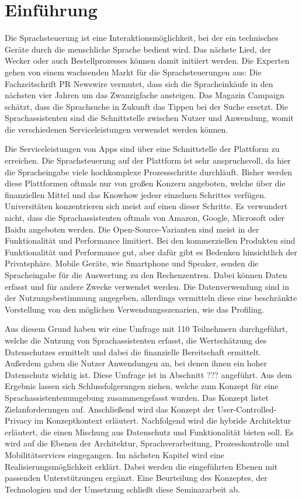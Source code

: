 \section{Einführung}

Die Sprachsteuerung ist eine Interaktionsmöglichkeit, bei der ein technisches Geräte durch die menschliche Sprache bedient wird. Das nächste Lied, der Wecker oder auch Bestellprozesses können damit initiiert werden.  Die Experten gehen von einem wachsenden Markt für die Sprachsteuerungen aus: Die Fachzeitschrift PR Newswire vermutet, dass sich die Spracheinkäufe in den nächsten vier Jahren um das Zwanzigfache ansteigen\cite{prNewswire}. Das Magazin Campaign schätzt, dass die Sprachsuche in Zukunft das Tippen bei der Suche ersetzt\cite{Campaign}. Die Sprachassistenten sind die Schnittstelle zwischen Nutzer und Anwendung, womit die verschiedenen Serviceleistungen verwendet werden können.

Die Serviceleistungen von Apps sind über eine Schnittstelle der Plattform zu erreichen. Die Sprachsteuerung auf der Plattform ist sehr anspruchsvoll, da hier die Spracheingabe viele hochkomplexe Prozessschritte durchläuft. Bisher werden diese Plattformen oftmals nur von großen Konzern angeboten, welche über die finanziellen Mittel und das Knowhow jedesr einzelnen Schrittes verfügen. Universitäten konzentrieren sich meist auf einen dieser Schritte. Es verwundert nicht, dass die Sprachassistenten oftmals von Amazon, Google, Microsoft oder Baidu angeboten werden. Die Open-Source-Varianten sind meist in der Funktionalität und Performance limitiert. Bei den kommerziellen Produkten sind Funktionalität und Performance gut, aber dafür gibt es Bedenken hinsichtlich der Privatsphäre. Mobile Geräte, wie Smartphone und Speaker, senden die Spracheingabe für die Auswertung zu den Rechenzentren. Dabei können Daten erfasst und für andere Zwecke verwendet werden. Die Datenverwendung sind in der Nutzungsbestimmung angegeben, allerdings vermitteln diese eine beschränkte Vorstellung von den möglichen Verwendungsszenarien, wie das Profiling. 

Aus diesem Grund haben wir eine Umfrage mit 110 Teilnehmern durchgeführt, welche die Nutzung von Sprachassistenten erfasst, die Wertschätzung des Datenschutzes ermittelt und dabei die finanzielle Bereitschaft ermittelt. Außerdem gaben die Nutzer Anwendungen an, bei denen ihnen ein hoher Datenschutz wichtig ist. Diese Umfrage ist in Abschnitt ??? angeführt. Aus dem Ergebnis lassen sich Schlussfolgerungen ziehen, welche zum Konzept für eine Sprachassistentenumgebung zusammengefasst wurden. Das Konzept listet Zielanforderungen auf. Anschließend wird das Konzept der User-Controlled-Privacy im Konzeptkontext erläutert.
Nachfolgend wird die hybride Architektur erläutert, die einen Mischung aus Datenschutz und Funktionalität bieten soll. Es wird auf die Ebenen der Architektur, Sprachverarbeitung, Prozesskontrolle und Mobilitätservices eingegangen.
Im nächsten Kapitel wird eine Realisierungsmöglichkeit erklärt. Dabei werden die eingeführten Ebenen mit passenden Unterstützungen ergänzt. 
Eine Beurteilung des Konzeptes, der Technologien und der Umsetzung schließt diese Seminararbeit ab.
